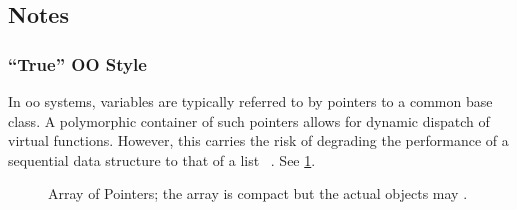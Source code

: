 \subsection{Notes}

\subsubsection{``True'' OO Style}

%


In \gls{oo} systems, variables are typically referred to by pointers to a common base
class.  A polymorphic container of such pointers allows for dynamic dispatch of virtual
functions.  However, this carries the risk of degrading the  performance of a
sequential data structure to that of a list%
~\cite[51:22]{stroustrup-talk}.
See \cref{fig:true-oo}.

\begin{figure}
   \centering
   
   \captionsetup{width=.9\linewidth} %
   \caption[Array of Pointers]{Array of Pointers; the array is compact but the actual
   objects may .}
   \label{fig:true-oo}
\end{figure}



